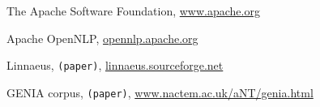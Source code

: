 \documentclass{article}
\newcommand{\TODO}[1]{\texttt{\textcolor{YellowOrange}{(#1)}}} %
\begin{document}
\begin{thebibliography}{99}
    The Apache Software Foundation,
    \href{http://www.apache.org/}{www.apache.org}

    Apache OpenNLP,
    \href{https://opennlp.apache.org/}{opennlp.apache.org}

    Linnaeus,
	\TODO{paper},
    \href{http://linnaeus.sourceforge.net/}{linnaeus.sourceforge.net}

    GENIA corpus,
	\TODO{paper},
    \href{http://www.nactem.ac.uk/aNT/genia.html}{www.nactem.ac.uk/aNT/genia.html}


\end{thebibliography}

\end{document}
